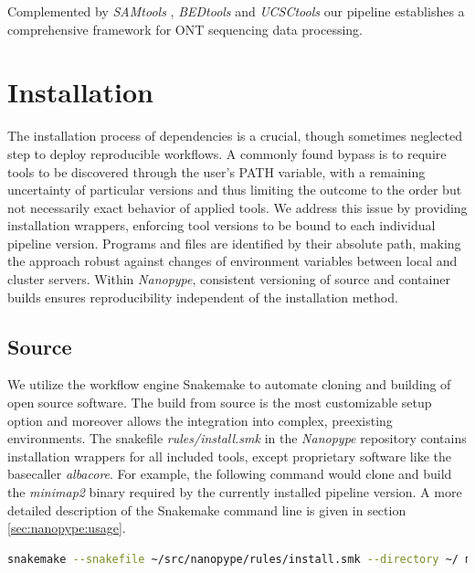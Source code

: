 Complemented by \textit{SAMtools} \cite{Li2009}, \textit{BEDtools} \cite{Quinlan2010} and \textit{UCSCtools} \cite{Kent2010} our pipeline establishes a comprehensive framework for ONT sequencing data processing.




\section{Installation}
\label{sec:nanopype:installation}

The installation process of dependencies is a crucial, though sometimes neglected step to deploy reproducible workflows. A commonly found bypass is to require tools to be discovered through the user's PATH variable, with a remaining uncertainty of particular versions and thus limiting the outcome to the order but not necessarily exact behavior of applied tools. We address this issue by providing installation wrappers, enforcing tool versions to be bound to each individual pipeline version. Programs and files are identified by their absolute path, making the approach robust against changes of environment variables between local and cluster servers. Within \textit{Nanopype}, consistent versioning of source and container builds ensures reproducibility independent of the installation method.


\subsection{Source}

We utilize the workflow engine Snakemake to automate cloning and building of open source software. The build from source is the most customizable setup option and moreover allows the integration into complex, preexisting environments. The snakefile \textit{rules/install.smk} in the \textit{Nanopype} repository contains installation wrappers for all included tools, except proprietary software like the basecaller \textit{albacore}. For example, the following command would clone and build the \textit{minimap2} binary required by the currently installed pipeline version. A more detailed description of the Snakemake command line is given in section \ref{sec:nanopype:usage}.

\begin{lstlisting}[language=sh, caption=Snakemake tool installation example]
snakemake --snakefile ~/src/nanopype/rules/install.smk --directory ~/ minimap2
\end{lstlisting}

